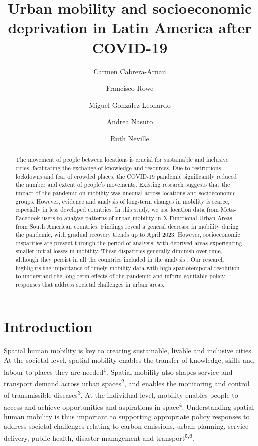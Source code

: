\documentclass[
  11pt,
]{article}
\title{\textbf{Urban mobility and socioeconomic deprivation in Latin
America after COVID-19}}
\author[1]{Carmen Cabrera-Arnau}
\author[1]{Francisco Rowe}
\author[2]{Miguel González-Leonardo}
\author[1]{Andrea Nasuto}
\author[1]{Ruth Neville}
\affil[1]{Geographic Data Science Lab, Department of Geography and
Planning, University of Liverpool, Liverpool, UK}
\affil[2]{Centre for Demographic Urban and Environmental Studies, El
Colegio de México, Ciudad de México, México}
\date{}
\begin{document}
\maketitle
\begin{abstract}
The movement of people between locations is crucial for sustainable and
inclusive cities, facilitating the exchange of knowledge and resources.
Due to restrictions, lockdowns and fear of crowded places, the COVID-19
pandemic significantly reduced the number and extent of people's
movements. Existing research suggests that the impact of the pandemic on
mobility was unequal across locations and socioeconomic groups. However,
evidence and analysis of long-term changes in mobility is scarce,
especially in less developed countries. In this study, we use location
data from Meta-Facebook users to analyse patterns of urban mobility in X
Functional Urban Areas from South American countries. Findings reveal a
general decrease in mobility during the pandemic, with gradual recovery
trends up to April 2023. However, socioeconomic disparities are present
through the period of analysis, with deprived areas experiencing smaller
initial losses in mobility. These disparities generally diminish over
time, although they persist in all the countries included in the
analysis . Our research highlights the importance of timely mobility
data with high spatiotemporal resolution to understand the long-term
effects of the pandemic and inform equitable policy responses that
address societal challenges in urban areas.
\end{abstract}
\ifdefined\Shaded\renewenvironment{Shaded}{\begin{tcolorbox}[enhanced, frame hidden, breakable, sharp corners, interior hidden, borderline west={3pt}{0pt}{shadecolor}, boxrule=0pt]}{\end{tcolorbox}}\fi

\hypertarget{sec-intro}{%
\section{Introduction}\label{sec-intro}}

Spatial human mobility is key to creating sustainable, livable and
inclusive cities. At the societal level, spatial mobility enables the
transfer of knowledge, skills and labour to places they are
needed\textsuperscript{1}. Spatial mobility also shapes service and
transport demand across urban spaces\textsuperscript{2}, and enables the
monitoring and control of transmissible diseases\textsuperscript{3}. At
the individual level, mobility enables people to access and achieve
opportunities and aspirations in space\textsuperscript{4}. Understanding
spatial human mobility is thus important to supporting appropriate
policy responses to address societal challenges relating to carbon
emissions, urban planning, service delivery, public health, disaster
management and transport\textsuperscript{5,6}.
\end{document}
